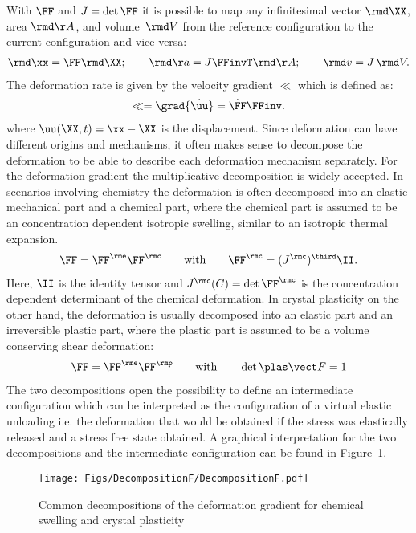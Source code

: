 With $\FF$ and \mbox{$J=\det{\FF}$} it is possible to map any infinitesimal vector $\rmd\XX$, area $\rmd\AA$, and volume $\dV$ from the reference configuration to the current configuration and vice versa:
\begin{align}
  \rmd\xx = \FF\rmd\XX; \qquad \rmd\aa = J \FFinvT \rmd\AA; \qquad \rmd v = J\dV.
\end{align}
The deformation rate is given by the velocity gradient $\ll$ which is defined as:
\begin{align}
  \ll = \grad{\dot{\uu}} = \dot\FF\FFinv.
\end{align}
where \mbox{$\uu(\XX,t)=\xx-\XX$} is the displacement. 
Since deformation can have different origins and mechanisms, it often makes sense to decompose the deformation to be able to describe each deformation mechanism separately. For the deformation gradient the multiplicative decomposition is widely accepted. In scenarios involving chemistry the deformation is often decomposed into an elastic mechanical part and a chemical part, where the chemical part is assumed to be an concentration dependent isotropic swelling, similar to an isotropic thermal expansion.
\begin{align}
  \FF=\FF^\rme\FF^\rmc \qquad \text{with}\qquad \FF^\rmc = (J^\rmc)^{\third}\II.
\end{align} 
Here, $\II$ is the identity tensor and $J^\rmc(C)=\det{\FF^\rmc}$ is the concentration dependent determinant of the chemical deformation. In crystal plasticity on the other hand, the deformation is usually decomposed into an elastic part and an irreversible plastic part, where the plastic part is assumed to be a volume conserving shear deformation:
\begin{align}
  \FF = \FF^\rme\FF^\rmp \qquad \text{with}\qquad \det\FFp = 1
  \label{eq:FFeFFp}
\end{align}
The two decompositions open the possibility to define an intermediate configuration which can be interpreted as the configuration of a virtual elastic unloading i.e. the deformation that would be obtained if the stress was elastically released and a stress free state obtained. A graphical interpretation for the two decompositions and the intermediate configuration can be found in Figure~\ref{fig:DecompositionF}. 
\begin{figure}[h!]
  \centering
  \texttt{[image: Figs/DecompositionF/DecompositionF.pdf]}
  \caption{Common decompositions of the deformation gradient for chemical swelling and crystal plasticity}
  \label{fig:DecompositionF}
\end{figure}

